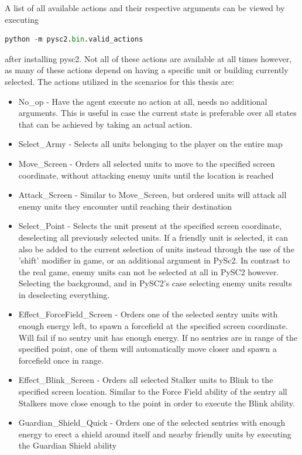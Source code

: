 A list of all available actions and their respective arguments can be viewed by executing
\begin{lstlisting}[language=Python]
python -m pysc2.bin.valid_actions
\end{lstlisting}
after installing pysc2. Not all of these actions are available at all times however, as many of these actions depend on having a specific unit or building currently selected.
The actions utilized in the scenarios for this thesis are:
\begin{itemize}
\item No\_op - Have the agent execute no action at all, needs no additional arguments. This is useful in case the current state is preferable over all states that can be achieved by taking an actual action.  
\item Select\_Army - Selects all units belonging to the player on the entire map
\item Move\_Screen - Orders all selected units to move to the specified screen coordinate, without attacking enemy units until the location is reached
\item Attack\_Screen - Similar to Move\_Screen, but ordered units will attack all enemy units they encounter until reaching their destination
\newpage
\item Select\_Point - Selects the unit present at the specified screen coordinate, deselecting all previously selected units. If a friendly unit is selected, it can also be added to the current selection of units instead through the use of the 'shift' modifier in game, or an additional argument in PySc2. In contrast to the real game, enemy units can not be selected at all in PySC2 however. Selecting the background, and in PySC2's case selecting enemy units results in deselecting everything.
\item Effect\_ForceField\_Screen - Orders one of the selected sentry units with enough energy left, to spawn a forcefield at the specified screen coordinate. Will fail if no sentry unit has enough energy. If no sentries are in range of the specified point, one of them will automatically move closer and spawn a forcefield once in range.
\item Effect\_Blink\_Screen - Orders all selected Stalker units to Blink to the specified screen location. Similar to the Force Field ability of the sentry all Stalkers move close enough to the point in order to execute the Blink ability. 
\item Guardian\_Shield\_Quick - Orders one of the selected sentries with enough energy to erect a shield around itself and nearby friendly units by executing the Guardian Shield ability
\end{itemize}


